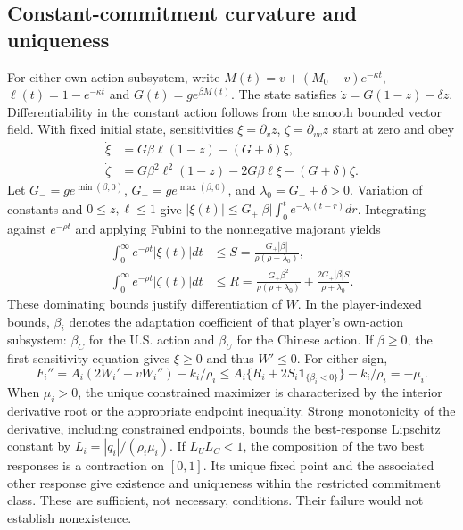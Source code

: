 \documentclass[11pt]{article}
\begin{document}
\subsection{Constant-commitment curvature and uniqueness}\label{app:commitment}
For either own-action subsystem, write $M(t)=v+(M_0-v)e^{-\kappa t}$, $\ell(t)=1-e^{-\kappa t}$ and $G(t)=g e^{\beta M(t)}$. The state satisfies $\dot z=G(1-z)-\delta z$. Differentiability in the constant action follows from the smooth bounded vector field. With fixed initial state, sensitivities $\xi=\partial_v z$, $\zeta=\partial_{vv}z$ start at zero and obey
\begin{align}
 \dot\xi&=G\beta\ell(1-z)-(G+\delta)\xi,\\
 \dot\zeta&=G\beta^2\ell^2(1-z)-2G\beta\ell\xi-(G+\delta)\zeta.
\end{align}
Let $G_-=g e^{\min(\beta,0)}$, $G_+=g e^{\max(\beta,0)}$, and $\lambda_0=G_-+\delta>0$. Variation of constants and $0\leq z,\ell\leq1$ give
$|\xi(t)|\leq G_+|\beta|\int_0^t e^{-\lambda_0(t-r)}dr$.
Integrating against $e^{-\rho t}$ and applying Fubini to the nonnegative majorant yields
\begin{align}
 \int_0^\infty e^{-\rho t}|\xi(t)|dt&\leq S=\frac{G_+|\beta|}{\rho(\rho+\lambda_0)},\\
 \int_0^\infty e^{-\rho t}|\zeta(t)|dt&\leq R=\frac{G_+\beta^2}{\rho(\rho+\lambda_0)}+\frac{2G_+|\beta|S}{\rho+\lambda_0}.
\end{align}
These dominating bounds justify differentiation of $W$. In the player-indexed bounds, $\beta_i$ denotes the adaptation coefficient of that player's own-action subsystem: $\beta_C$ for the U.S. action and $\beta_U$ for the Chinese action. If $\beta\geq0$, the first sensitivity equation gives $\xi\geq0$ and thus $W'\leq0$. For either sign,
\begin{equation}
 F_i''=A_i(2W_i'+vW_i'')-k_i/\rho_i
 \leq A_i\{R_i+2S_i\mathbf1_{\{\beta_i<0\}}\}-k_i/\rho_i=-\mu_i.
\end{equation}
When $\mu_i>0$, the unique constrained maximizer is characterized by the interior derivative root or the appropriate endpoint inequality. Strong monotonicity of the derivative, including constrained endpoints, bounds the best-response Lipschitz constant by $L_i=|q_i|/(\rho_i\mu_i)$. If $L_UL_C<1$, the composition of the two best responses is a contraction on $[0,1]$. Its unique fixed point and the associated other response give existence and uniqueness within the restricted commitment class. These are sufficient, not necessary, conditions. Their failure would not establish nonexistence.
\end{document}
